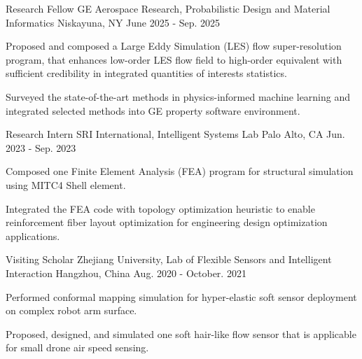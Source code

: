 \begin{cventries}
\cventry
    {Research Fellow} %
    {GE Aerospace Research, Probabilistic Design and Material Informatics} %
    {Niskayuna, NY} %
    {June 2025 - Sep. 2025} %
    {
      \begin{cvitems} %
        \item {Proposed and composed a Large Eddy Simulation (LES) flow super-resolution program, that enhances low-order LES flow field to high-order equivalent with sufficient credibility in integrated quantities of interests statistics.}
        \item {Surveyed the state-of-the-art methods in physics-informed machine learning and integrated selected methods into GE property software environment.}
      \end{cvitems}
    }
  \cventry
    {Research Intern} %
    {SRI International, Intelligent Systems Lab} %
    {Palo Alto, CA} %
    {Jun. 2023 - Sep. 2023} %
    {
      \begin{cvitems} %
        \item {Composed one Finite Element Analysis (FEA) program for structural simulation using MITC4 Shell element.}
        \item {Integrated the FEA code with topology optimization heuristic to enable reinforcement fiber layout optimization for engineering design optimization applications.}
      \end{cvitems}
    }

  \cventry
    {Visiting Scholar} %
    {Zhejiang University, Lab of Flexible Sensors and Intelligent Interaction} %
    {Hangzhou, China} %
    {Aug. 2020 - October. 2021} %
    {
      \begin{cvitems} %
        \item {Performed conformal mapping simulation for hyper-elastic soft sensor deployment on complex robot arm surface.}
        \item {Proposed, designed, and simulated one soft hair-like flow sensor that is applicable for small drone air speed sensing.}
      \end{cvitems}
    }


\end{cventries}
